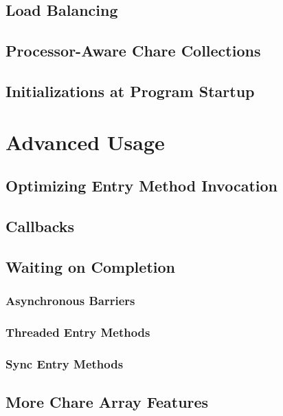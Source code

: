 \documentclass[10pt]{report}
\begin{document}
\chapter{Load Balancing}
\label{loadbalancing}
  

\chapter{Processor-Aware Chare Collections}
  
  

\chapter{Initializations at Program Startup}
  

\part{Advanced Usage}

\chapter{Optimizing Entry Method Invocation}
  
  
  

\chapter{Callbacks}
  

\chapter{Waiting on Completion}
  \section{Asynchronous Barriers}
  \section{Threaded Entry Methods}
  \section{Sync Entry Methods}
  
  

\chapter{More Chare Array Features}
\label{advanced arrays}
  
\end{document}
